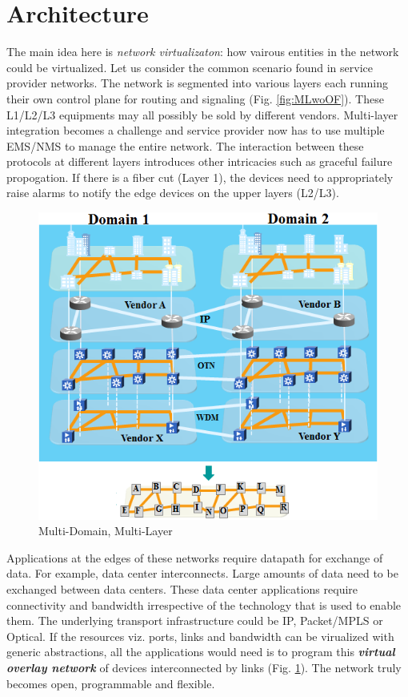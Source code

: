 \documentclass{sig-alternate-10pt}
\begin{document}
\section{Architecture}
\label{sec:arch}
		
	The main idea here is \emph{network virtualizaton}: how vairous entities in the network could be virtualized.
	Let us consider the common scenario found in service provider networks. The network is segmented into
	various layers each running their own control plane for routing and signaling (Fig. \ref{fig:MLwoOF}).
	These L1/L2/L3 equipments may all possibly be sold by different vendors. Multi-layer integration becomes
	a challenge and service provider now has to use multiple EMS/NMS to manage the entire network. The
	interaction between these protocols at different layers introduces other intricacies such as graceful
	failure propogation. If there is a fiber cut (Layer 1), the devices need to appropriately raise alarms to
	notify the edge devices on the upper layers (L2/L3). \\

\begin{figure}[htb]
	\centering
	\includegraphics[scale=0.50]{MultiDomainLayer.png}
	\caption{Multi-Domain, Multi-Layer}
	\label{fig:MDL}
	\end{figure}
	
	Applications at the edges of these networks require datapath for exchange of data. For example, data
	center interconnects. Large amounts of data need to be exchanged between data centers. These data center
	applications require connectivity and bandwidth irrespective of the technology that is used to enable
	them. The underlying transport infrastructure could be IP, Packet/MPLS or Optical. If the resources viz.
	ports, links and bandwidth can be virualized with generic abstractions, all the applications would need
	is to program this \emph{\bf virtual overlay network} of devices interconnected by links (Fig.
	\ref{fig:MDL}). The network truly becomes open, programmable and flexible. \\
		
\end{document}
